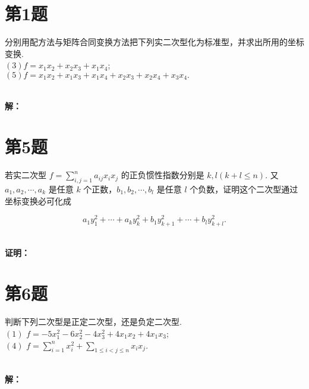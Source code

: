 \documentclass[a4paper, 12pt]{ctexart}
\begin{document}
\makeHomeworkTitle


\section{第1题}

\begin{exercise}
分别用配方法与矩阵合同变换方法把下列实二次型化为标准型，并求出所用的坐标变换.~\\

$(3) f = x_{1}x_{2}+x_{2}x_{3}+x_{1}x_{4}$;~\\

$(5) f = x_{1}x_{2}+x_{1}x_{3}+x_{1}x_{4}+x_{2}x_{3}+x_{2}x_{4}+x_{3}x_{4}.$

\end{exercise}~\\

\noindent\textbf{解：}\\


\section{第5题}
\begin{exercise}
若实二次型 \( f=\sum_{i,j = 1}^{n}  a_{ij}x_i x_j\) 的正负惯性指数分别是 \( k, l(k+l \leq n) \).
又 \( a_1, a_2, \cdots, a_k \) 是任意 \( k \) 个正数，\( b_1, b_2, \cdots, b_l \) 是任意 \( l \) 个负数，证明这个二次型通过坐标变换必可化成  

\[a_1 y_1^2 + \cdots + a_k y_k^2 + b_1 y_{k+1}^2 + \cdots + b_l y_{k+l}^2.\]
\end{exercise}~\\
\noindent\textbf{证明：}~\\

\section{第6题}
\begin{exercise}
判断下列二次型是正定二次型，还是负定二次型.~\\

$(1)$ \( f = -5x_1^2 - 6x_2^2 - 4x_3^2 + 4x_1x_2 + 4x_1x_3 \);~\\

$(4)$ \( f = \sum_{i=1}^n x_i^2 + \sum_{1 \leq i < j \leq n} x_i x_j \).
\end{exercise}~\\
\noindent\textbf{解：}\\
\end{document}
